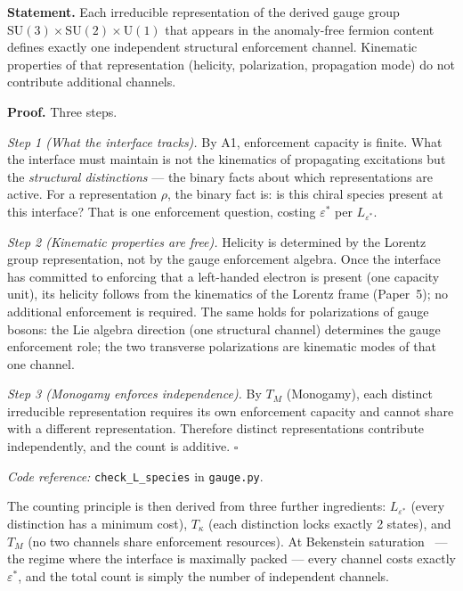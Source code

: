 \documentclass[11pt]{article}
\newcommand{\coderef}[2]{\smallskip\noindent\textit{Code reference:} \texttt{#1} in \texttt{#2}.}
\newcommand{\SU}{\mathrm{SU}}
\newcommand{\U}{\mathrm{U}}
\begin{document}
\begin{tcolorbox}[apfbox, title={Lemma $L_{\mathrm{species}}$ (Species as Enforcement Channels)}]
\textbf{Statement.}  Each irreducible representation of the derived gauge group $\SU(3) \times \SU(2) \times \U(1)$ that appears in the anomaly-free fermion content defines exactly one independent structural enforcement channel.  Kinematic properties of that representation (helicity, polarization, propagation mode) do not contribute additional channels.

\smallskip\noindent\textbf{Proof.}  Three steps.

\textit{Step 1 (What the interface tracks).}  By A1, enforcement capacity is finite.  What the interface must maintain is not the kinematics of propagating excitations but the \emph{structural distinctions} --- the binary facts about which representations are active.  For a representation $\rho$, the binary fact is: is this chiral species present at this interface?  That is one enforcement question, costing $\varepsilon^*$ per $L_{\varepsilon^*}$.

\textit{Step 2 (Kinematic properties are free).}  Helicity is determined by the Lorentz group representation, not by the gauge enforcement algebra.  Once the interface has committed to enforcing that a left-handed electron is present (one capacity unit), its helicity follows from the kinematics of the Lorentz frame (Paper~5); no additional enforcement is required.  The same holds for polarizations of gauge bosons: the Lie algebra direction (one structural channel) determines the gauge enforcement role; the two transverse polarizations are kinematic modes of that one channel.

\textit{Step 3 (Monogamy enforces independence).}  By $T_M$ (Monogamy), each distinct irreducible representation requires its own enforcement capacity and cannot share with a different representation.  Therefore distinct representations contribute independently, and the count is additive.  $\square$

\coderef{check\_L\_species}{gauge.py}
\end{tcolorbox}

The counting principle is then derived from three further ingredients: $L_{\varepsilon^*}$ (every distinction has a minimum cost), $T_\kappa$ (each distinction locks exactly 2 states), and $T_M$ (no two channels share enforcement resources).  At Bekenstein saturation~\cite{Bekenstein1973} --- the regime where the interface is maximally packed --- every channel costs exactly $\varepsilon^*$, and the total count is simply the number of independent channels.
\end{document}
